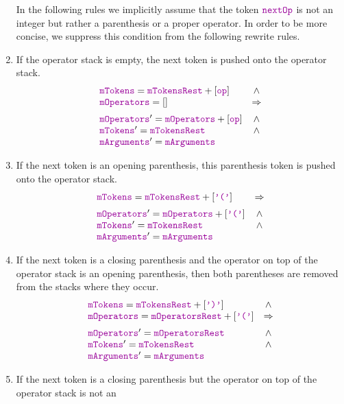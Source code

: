 \begin{enumerate}
      In the following rules we implicitly assume that the token $\mytt{nextOp}$ is not an integer but rather a parenthesis
      or a proper operator.  In order to be more concise, we suppress this condition from the following rewrite rules.
\item If the operator stack is empty, the next token is pushed onto the operator stack.
    $$\begin{array}{lc}
        \mytt{mTokens} = \mytt{mTokensRest} + [\mytt{op} ] & \wedge \\
        \mytt{mOperators} = []                                 & \Rightarrow \\[0.2cm]
        \mytt{mOperators}' = \mytt{mOperators} + [\mytt{op}] & \wedge \\
        \mytt{mTokens}' = \mytt{mTokensRest} & \wedge \\
        \mytt{mArguments}' = \mytt{mArguments} 
        \end{array} 
      $$
\item If the next token is an opening parenthesis, this parenthesis token is pushed onto the operator stack.
     $$\begin{array}{lcll}
         \mytt{mTokens} = \mytt{mTokensRest} + [\mytt{'('} ] & \Rightarrow \\[0.2cm]
         \mytt{mOperators}' = \mytt{mOperators} + [\mytt{'('}] & \wedge \\
         \mytt{mTokens}' = \mytt{mTokensRest} & \wedge \\
         \mytt{mArguments}' = \mytt{mArguments} 
         \end{array} 
      $$
\item If the next token is a closing parenthesis and the operator on top of the operator stack is an opening
      parenthesis, then both parentheses are removed from the stacks where they occur.
     $$\begin{array}{lc}
         \mytt{mTokens} = \mytt{mTokensRest} + [\mytt{')'}] & \wedge \\
         \mytt{mOperators} = \mytt{mOperatorsRest} + [\mytt{'('}] & \Rightarrow \\[0.2cm]
         \mytt{mOperators}' = \mytt{mOperatorsRest} & \wedge \\
         \mytt{mTokens}' = \mytt{mTokensRest} & \wedge \\
         \mytt{mArguments}' = \mytt{mArguments} 
         \end{array} 
      $$
\item If the next token is a closing parenthesis but the operator on top of the operator stack is not an

\end{enumerate}
